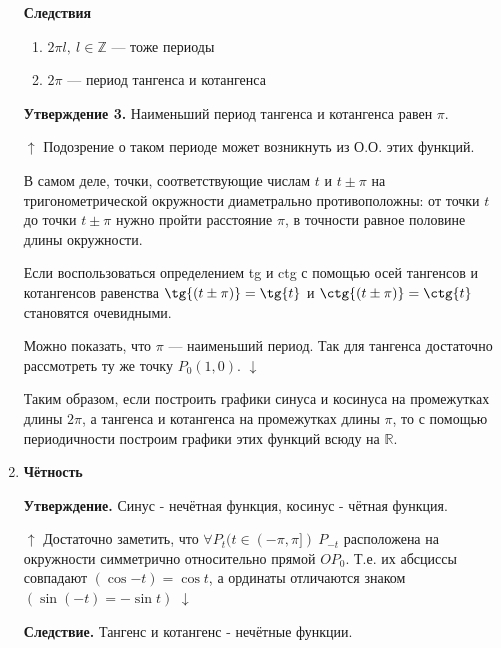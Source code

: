\documentclass{article}
\begin{document}
\begin{enumerate}
            \textbf{Следствия}
            
            \begin{enumerate}[1.]
            \item \(2 \pi l,\ l \in \mathbb{Z}\) --- тоже периоды
            
            \item \(2 \pi\) --- период тангенса и котангенса
            
            \end{enumerate}
            
            \textbf{Утверждение 3.} Наименьший период тангенса и котангенса равен \(\pi\).
            
            \(\uparrow\) Подозрение о таком периоде может возникнуть из О.О. этих функций.
            
            В самом деле, точки, соответствующие числам \(t\) и \(t \pm \pi\) на тригонометрической окружности диаметрально противоположны: от точки \(t\) до точки \(t \pm \pi\) нужно пройти расстояние \(\pi\), в точности равное половине длины окружности.
            
            Если воспользоваться определением tg и ctg с помощью осей тангенсов и котангенсов равенства \(\tg{(t \pm \pi)} = \tg{t}\) и \(\ctg{(t \pm \pi)} = \ctg{t}\) становятся очевидными.
            
            Можно показать, что \(\pi\) --- наименьший период. Так для тангенса достаточно рассмотреть ту же точку \(P_0(1, 0)\). \(\downarrow\)
            
            Таким образом, если построить графики синуса и косинуса на промежутках длины \(2 \pi\), а тангенса и котангенса на промежутках длины \(\pi\), то с помощью периодичности построим графики этих функций всюду на \(\mathbb{R}\).
            
            \item \textbf{Чётность}
            
            \textbf{Утверждение.} Синус - нечётная функция, косинус - чётная функция.
            
            \(\uparrow\) Достаточно заметить, что \(\forall P_t(t \in (-\pi, \pi]) \ P_{-t}\) расположена на окружности симметрично относительно прямой \(OP_0\).
            Т.е. их абсциссы совпадают \((\cos{-t}) = \cos{t}\), а ординаты отличаются знаком \((\sin{(-t)} = -\sin{t})\) \(\downarrow\)
            
            \textbf{Следствие.} Тангенс и котангенс - нечётные функции.
            

\end{enumerate}
\end{document}
